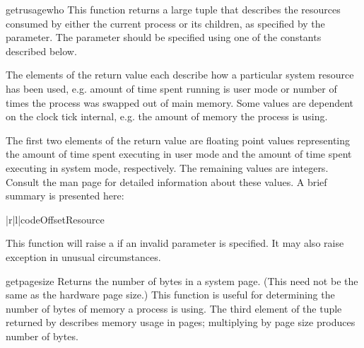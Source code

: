 \begin{funcdesc}{getrusage}{who}
  This function returns a large tuple that describes the resources
  consumed by either the current process or its children, as specified
  by the  parameter.  The  parameter should be
  specified using one of the  constants described
  below.

  The elements of the return value each
  describe how a particular system resource has been used, e.g. amount
  of time spent running is user mode or number of times the process was
  swapped out of main memory. Some values are dependent on the clock
  tick internal, e.g. the amount of memory the process is using.

  The first two elements of the return value are floating point values
  representing the amount of time spent executing in user mode and the
  amount of time spent executing in system mode, respectively. The
  remaining values are integers. Consult the 
  man page for detailed information about these values. A brief
  summary is presented here:

\begin{tableii}{|r|l|}{code}{Offset}{Resource}
\end{tableii}

  This function will raise a  if an invalid
   parameter is specified. It may also raise
   exception in unusual circumstances.
\end{funcdesc}

\begin{funcdesc}{getpagesize}{}
  Returns the number of bytes in a system page. (This need not be the
  same as the hardware page size.) This function is useful for
  determining the number of bytes of memory a process is using. The
  third element of the tuple returned by  describes
  memory usage in pages; multiplying by page size produces number of
  bytes. 
\end{funcdesc}

